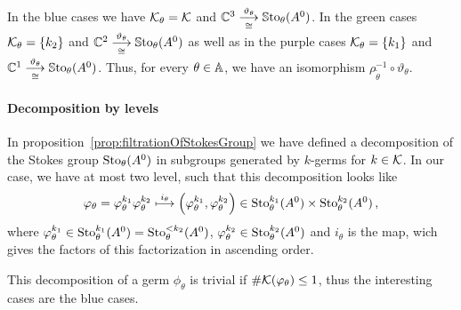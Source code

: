 In the \textcolor{blue!75!black}{blue} cases we have $\mathcal{K}_\theta=\mathcal{K}$ and
$\mathbb{C}^3\overset{\vartheta_\theta}{\underset{\cong}{\longrightarrow}}\operatorname{\mathbb{S}to}_\theta(A^0)$.
In the \textcolor{green!75!black}{green} cases $\mathcal{K}_\theta=\{k_2\}$ and
$\mathbb{C}^2\overset{\vartheta_\theta}{\underset{\cong}{\longrightarrow}}\operatorname{\mathbb{S}to}_\theta(A^0)$ as
well as in the \textcolor{purple!75!black}{purple} cases $\mathcal{K}_\theta=\{k_1\}$
and $\mathbb{C}^1\overset{\vartheta_\theta}{\underset{\cong}{\longrightarrow}}\operatorname{\mathbb{S}to}_\theta(A^0)$.
Thus, for every $\theta\in\mathbb{A}$, we have an isomorphism
$\rho_{\tilde\theta}^{-1}\circ\vartheta_\theta$.

\paragraph{Decomposition by levels}
In proposition~\ref{prop:filtrationOfStokesGroup} we have defined a
decomposition of the Stokes group $\operatorname{Sto}_\theta(A^0)$ in subgroups generated by
$k$-germs for $k\in\mathcal{K}$.
In our case, we have at most two level, such that this decomposition looks like
\[
  \varphi_\theta=\varphi_\theta^{k_1} \varphi_\theta^{k_2}
  \overset{i_\theta}\longmapsto
    \left(\varphi_\theta^{k_1},\varphi_\theta^{k_2}\right)
      \in\operatorname{Sto}_\theta^{k_1}(A^0)\times\operatorname{Sto}_\theta^{k_2}(A^0) \,,
\]
where $\varphi_\theta^{k_1}\in\operatorname{Sto}_\theta^{k_1}(A^0)=\operatorname{Sto}_\theta^{<k_2}(A^0)$,
$\varphi_\theta^{k_2}\in\operatorname{Sto}_\theta^{k_2}(A^0)$  and $i_\theta$ is the map, wich
gives the factors of this factorization in ascending order.

This decomposition of a germ $\phi_\theta$ is trivial if
$\#\mathcal{K}(\varphi_\theta)\leq1$, thus the interesting cases are the
\textcolor{blue!75!black}{blue} cases.

